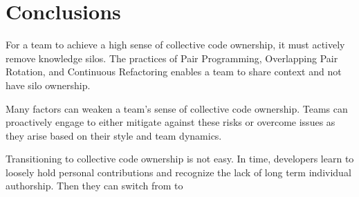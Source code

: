 \section{Conclusions}
For a team to achieve a high sense of collective code ownership, it must actively remove knowledge silos. The practices of Pair Programming, Overlapping Pair Rotation, and Continuous Refactoring enables a team to share context and not have silo ownership. 

Many factors can weaken a team's sense of collective code ownership. Teams can proactively engage to either mitigate against these risks or overcome issues as they arise based on their style and team dynamics. 

Transitioning to collective code ownership is not easy. In time, developers learn to loosely hold personal contributions and recognize the lack of long term individual authorship. Then they can switch from  to 







